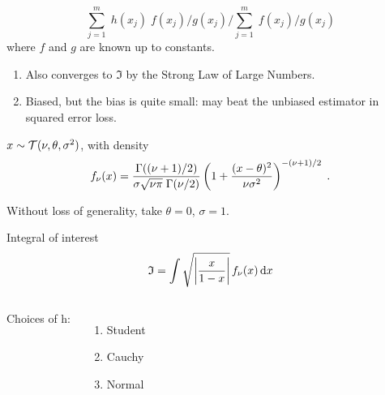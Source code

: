 \begin{slide}
\begin{displaymath}
\sum_{j=1}^m \; h(x_{j}) \; f(x_{j}) / g(x_{j}) \bigg/
\sum_{j=1}^m \; f(x_{j}) / g(x_{j})
\end{displaymath}
where $f$ and $g$ are known up to constants.

\begin{enumerate}
\item Also converges to ${\mathfrak{I}}$ by the Strong Law of Large Numbers.
\item Biased, but the bias is quite small:
may beat the unbiased estimator in squared error loss.
\end{enumerate}  

\end{slide}\begin{slide}
$x \sim {\cal{T}}(\nu,\theta,\sigma^2)$, with density
$$
f_\nu(x) = {\Gamma((\nu+1)/2)\over \sigma \sqrt{\nu\pi} \; \Gamma(\nu/2)}
\left(1+{(x - \theta)^2\over \nu \sigma^2}\right)^{-(\nu+1)/2} \;. 
$$

Without loss of generality, take $\theta = 0$, $\sigma = 1$.

\pause
Integral of interest
$$
\mathfrak{I} = \int \sqrt{\left|{x\over 1-x}\right|} \,f_\nu(x) \,\hbox{d}x
$$
\fin

\end{slide}\begin{slide}
\begin{columns}
Choices of h:
\begin{enumerate}
\item Student \   
\item Cauchy \        
\item Normal \    
\end{enumerate}


\end{columns}
\end{slide}
